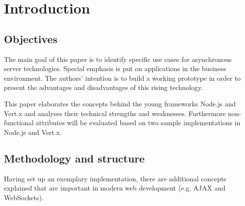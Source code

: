 \listoftables
{}
\newpage


\listoffigures
{}
\newpage

\lstlistoflistings
{}
\newpage

\renewcommand{\thepage}{\arabic{page}}

\setcounter{page}{1} 

\renewcommand{\baselinestretch}{1.4}\normalsize

\section{Introduction}

\subsection{Objectives}
The main goal of this paper is to identify specific use cases for asynchronous server
technologies. Special emphasis is put on applications in the business environment. 
The authors' intention is to build a working prototype in order to present the advantages and
disadvantages of this rising technology.

This paper elaborates the concepts behind the young frameworks Node.js and Vert.x and analyses their 
technical strengths and weaknesses. Furthermore non-functional attributes will be
evaluated based on two sample implementations in Node.js  and Vert.x.

\subsection{Methodology and structure}

Having set up an exemplary implementation, there are additional concepts explained that are important in modern web development (e.g. AJAX and WebSockets).

